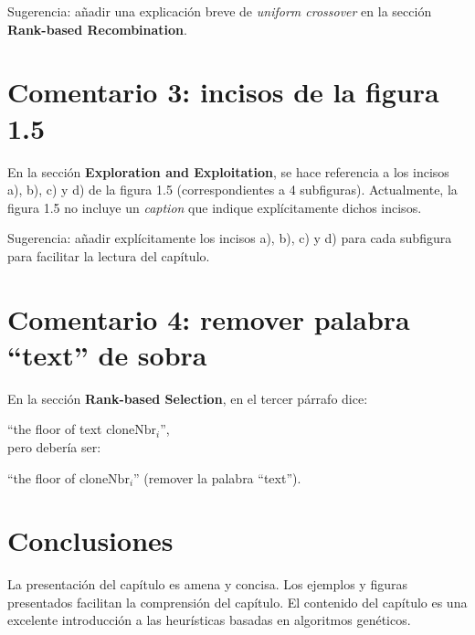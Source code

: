 \documentclass{article}
\begin{document}
Sugerencia: añadir una explicación breve de \textit{uniform crossover} en la sección \textbf{Rank-based Recombination}.

\section*{Comentario 3: incisos de la figura 1.5}

En la sección \textbf{Exploration and Exploitation}, se hace referencia a los incisos a), b), c) y d) de la figura 1.5 (correspondientes a 4 subfiguras). Actualmente, la figura 1.5 no incluye un \textit{caption} que indique explícitamente dichos incisos.

Sugerencia: añadir explícitamente los incisos a), b), c) y d) para cada subfigura para facilitar la lectura del capítulo.

\section*{Comentario 4: remover palabra ``text'' de sobra}

En la sección \textbf{Rank-based Selection}, en el tercer párrafo dice: 

``the floor of text \( \text{cloneNbr}_{i} \)'', \\
pero debería ser:

``the floor of \( \text{cloneNbr}_{i} \)'' (remover la palabra ``text'').

\section*{Conclusiones}

La presentación del capítulo es amena y concisa. Los ejemplos y figuras presentados facilitan la comprensión del capítulo. El contenido del capítulo es una excelente introducción a las heurísticas basadas en algoritmos genéticos.
\end{document}

